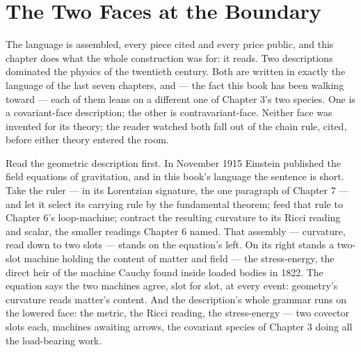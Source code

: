 \chapter{The Two Faces at the Boundary}

The language is assembled, every piece cited and every price public, and
this chapter does what the whole construction was for: it reads. Two
descriptions dominated the physics of the twentieth century. Both are
written in exactly the language of the last seven chapters, and --- the
fact this book has been walking toward --- each of them leans on a
different one of Chapter 3's two species. One is a covariant-face
description; the other is contravariant-face. Neither face was invented
for its theory; the reader watched both fall out of the chain rule,
cited, before either theory entered the room.

Read the geometric description first. In November 1915 Einstein published
the field equations of gravitation, and in this book's language the
sentence is short. Take the ruler --- in its Lorentzian signature, the one
paragraph of Chapter 7 --- and let it select its carrying rule by the
fundamental theorem; feed that rule to Chapter 6's loop-machine; contract
the resulting curvature to its Ricci reading and scalar, the smaller
readings Chapter 6 named. That assembly --- curvature, read down to two
slots --- stands on the equation's left. On its right stands a two-slot
machine holding the content of matter and field --- the stress-energy,
the direct heir of the machine Cauchy found inside loaded bodies in 1822.
The equation says the two machines agree, slot for slot, at every event:
geometry's curvature reads matter's content. And the description's whole
grammar runs on the lowered face: the metric, the Ricci reading, the
stress-energy --- two covector slots each, machines awaiting arrows, the
covariant species of Chapter 3 doing all the load-bearing work.

